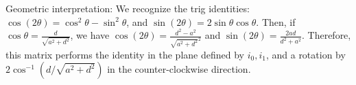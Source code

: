 \documentclass[11pt]{article}
\begin{document}
\begin{enumerate}
Geometric interpretation: We recognize the trig identities: $\cos (2\theta) = \cos^2 \theta - \sin^2 \theta$, and $\sin(2\theta) = 2 \sin\theta \cos\theta$.
        Then, if $\cos\theta = \frac{d}{\sqrt{a^2 + d^2}}$, we have $\cos (2\theta) = \frac{d^2 - a^2}{\sqrt{a^2 + d^2}^2}$ and $\sin(2 \theta) = \frac{2ad}{d^2 + a^2}$.
        Therefore, this matrix performs the identity in the plane defined by $i_0, i_1$, and a rotation by $2 \cos^{-1}(d / \sqrt{a^2 + d^2})$ in the counter-clockwise direction.

\end{enumerate}
\end{document}
